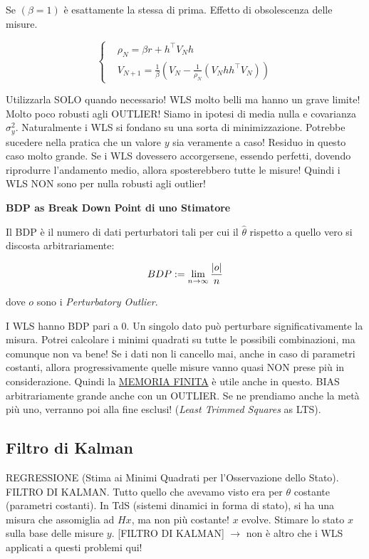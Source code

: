 Se $(\beta=1)$ è esattamente la stessa di prima. Effetto di obsolescenza delle misure.

\[
	\left\{
	\begin{aligned}
	&\rho_N = \beta r + h^\top V_Nh\\
	&V_{N+1} = \frac{1}{\beta}(V_N-\frac{1}{\rho_N}(V_Nhh^\top V_N))
	\end{aligned}
	\right.
\]

Utilizzarla SOLO quando necessario! WLS molto belli ma hanno un grave limite! Molto poco robusti agli OUTLIER! Siamo in ipotesi di media nulla e covarianza $\sigma^2_y$. Naturalmente i WLS si fondano su una sorta di minimizzazione. Potrebbe sucedere nella pratica che un valore $y$ sia veramente  a caso! Residuo in questo caso molto grande. Se i WLS dovessero accorgersene, essendo perfetti, dovendo riprodurre l'andamento medio, allora sposterebbero tutte le misure! Quindi i WLS NON sono per nulla robusti agli outlier!

\begin{defn}{\textbf{BDP as Break Down Point di uno Stimatore}}

Il BDP è il numero di dati perturbatori tali per cui il $\hat{\theta}$ rispetto a quello vero si discosta arbitrariamente:

\[
	BDP := \lim_{n\to\infty}{\frac{\lvert o\rvert}{n}}
\]

dove $o$ sono i \textit{Perturbatory Outlier}.

\end{defn}

I WLS hanno BDP pari a 0. Un singolo dato può perturbare significativamente la misura. Potrei calcolare i minimi quadrati su tutte le possibili combinazioni, ma comunque non va bene! Se i dati non li cancello mai, anche in caso di parametri costanti, allora progressivamente quelle misure vanno quasi NON prese più in considerazione. Quindi la \underline{MEMORIA FINITA} è utile anche in questo. BIAS arbitrariamente grande anche con un OUTLIER. Se ne prendiamo anche la metà più uno, verranno poi alla fine esclusi! (\textit{Least Trimmed Squares} as LTS).

\subsection{Filtro di Kalman}

REGRESSIONE (Stima ai Minimi Quadrati per l'Osservazione dello Stato). FILTRO DI KALMAN. Tutto quello che avevamo visto era per $\theta$ costante (parametri costanti). In TdS (sistemi dinamici in forma di stato), si ha una misura che assomiglia ad $Hx$, ma non più costante! $x$ evolve. Stimare lo stato $x$ sulla base delle misure $y$. [FILTRO DI KALMAN] $\rightarrow$ non è altro che i WLS applicati a questi problemi qui!

